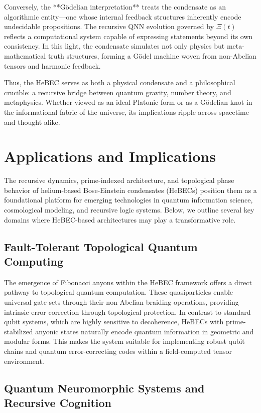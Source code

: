 \documentclass{article}
\theoremstyle{plain}
\begin{document}
Conversely, the **Gödelian interpretation** treats the condensate as an algorithmic entity—one whose internal feedback structures inherently encode undecidable propositions. The recursive QNN evolution governed by \(\Xi(t)\) reflects a computational system capable of expressing statements beyond its own consistency. In this light, the condensate simulates not only physics but meta-mathematical truth structures, forming a Gödel machine woven from non-Abelian tensors and harmonic feedback.

\vspace{0.5em}
Thus, the HeBEC serves as both a physical condensate and a philosophical crucible: a recursive bridge between quantum gravity, number theory, and metaphysics. Whether viewed as an ideal Platonic form or as a Gödelian knot in the informational fabric of the universe, its implications ripple across spacetime and thought alike.

\section{Applications and Implications}

The recursive dynamics, prime-indexed architecture, and topological phase behavior of helium-based Bose-Einstein condensates (HeBECs) position them as a foundational platform for emerging technologies in quantum information science, cosmological modeling, and recursive logic systems. Below, we outline several key domains where HeBEC-based architectures may play a transformative role.

\subsection{Fault-Tolerant Topological Quantum Computing}

The emergence of Fibonacci anyons within the HeBEC framework offers a direct pathway to topological quantum computation. These quasiparticles enable universal gate sets through their non-Abelian braiding operations, providing intrinsic error correction through topological protection. In contrast to standard qubit systems, which are highly sensitive to decoherence, HeBECs with prime-stabilized anyonic states naturally encode quantum information in geometric and modular forms. This makes the system suitable for implementing robust qubit chains and quantum error-correcting codes within a field-computed tensor environment.

\subsection{Quantum Neuromorphic Systems and Recursive Cognition}
\end{document}
